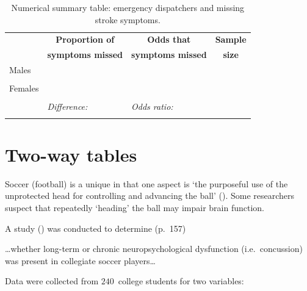 \documentclass[
  11pt,
  a4paper,
  krantz2]{krantz}
\makeatletter
\renewenvironment{quote}%
{\begin{kframe}}
{\end{kframe}}
\newenvironment{kframe}{%
\medskip{}
\setlength{\fboxsep}{.8em}
 \def\at@end@of@kframe{}%
 \ifinner\ifhmode%
  \def\at@end@of@kframe{\end{minipage}}%
  \begin{minipage}{\columnwidth}%
 \fi\fi%
 \def\FrameCommand##1{\hskip\@totalleftmargin \hskip-\fboxsep
 \colorbox{shadecolor}{##1}\hskip-\fboxsep
     \hskip-\linewidth \hskip-\@totalleftmargin \hskip\columnwidth}%
 \MakeFramed {\advance\hsize-\width
   \@totalleftmargin\z@ \linewidth\hsize
   \@setminipage}}%
 {\par\unskip\endMakeFramed%
 \at@end@of@kframe}
\renewenvironment{quote}
               {\list{}{\vspace{-0.5em}\begin{kframe}\small%
                        \rightmargin   \leftmargin
                        \parsep        \z@ \@plus\p@}%
                \item\relax}
               {\end{kframe}\endlist}
\makeatother
\begin{document}
\begin{table}
\centering
\caption{\label{tab:StrokeSymptomsSummary}Numerical summary table: emergency dispatchers and missing stroke symptoms.}
\centering
\fontsize{10}{12}\selectfont
\begin{tabular}[t]{l|c|c|c}
\hline
\multicolumn{1}{c|}{\textbf{ }} & \multicolumn{1}{c|}{\textbf{Proportion of}} & \multicolumn{1}{c|}{\textbf{Odds that}} & \multicolumn{1}{c}{\textbf{Sample}} \\
\textbf{ } & \textbf{symptoms missed} & \textbf{symptoms missed} & \textbf{size}\\
\hline
Males & \null & \null & \null\\
 
\null & \null & \null & \vphantom{2} \null\\
\hline
Females & \null & \null & \null\\
 
\null & \null & \null & \vphantom{1} \null\\
\hline
\null & \multicolumn{1}{l|}{\em{Difference:\hspace{4cm}\null }} & \multicolumn{1}{l|}{\em{Odds ratio:\hspace{4cm}\null }} & \null\\
 
\null & \null & \null & \null\\
\hline
\end{tabular}
\end{table}

\section{Two-way tables}\label{TwoWayTables}

Soccer (football) is a unique in that one aspect is `the purposeful use of the unprotected head for controlling and advancing the ball' ().
Some researchers suspect that repeatedly `heading' the ball may impair brain function.

A study () was conducted to determine (p.~157)

\begin{quote}
\ldots whether long-term or chronic neuropsychological dysfunction (i.e.~concussion) was present in collegiate soccer players\ldots{}
\end{quote}

Data were collected from \(240\)~college students for two variables:
\end{document}
